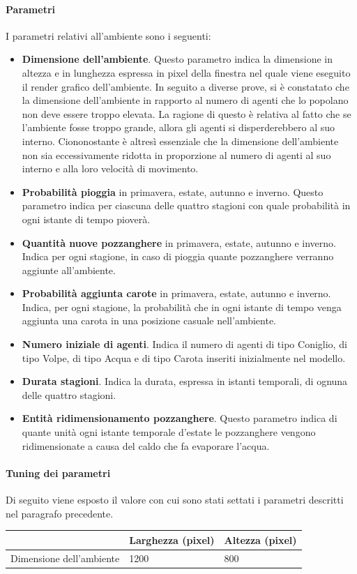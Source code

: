 \documentclass[11pt]{article}
\begin{document}
\paragraph{Parametri}
I parametri relativi all'ambiente sono i seguenti: 
\begin{itemize}
    \item \textbf{Dimensione dell'ambiente}. Questo parametro indica la dimensione in altezza e in lunghezza espressa in pixel della finestra nel quale viene eseguito il render grafico dell'ambiente. In seguito a diverse prove, si è constatato che la dimensione dell'ambiente in rapporto al numero di agenti che lo popolano non deve essere troppo elevata. La ragione di questo è relativa al fatto che se l'ambiente fosse troppo grande, allora gli agenti si disperderebbero al suo interno. Ciononostante è altresì essenziale che la dimensione dell'ambiente non sia eccessivamente ridotta in proporzione al numero di agenti al suo interno e alla loro velocità di movimento. 
    \item \textbf{Probabilità pioggia} in primavera, estate, autunno e inverno. Questo parametro indica per ciascuna delle quattro stagioni con quale probabilità in ogni istante di tempo pioverà.
    \item \textbf{Quantità nuove pozzanghere} in primavera, estate, autunno e inverno. Indica per ogni stagione, in caso di pioggia quante pozzanghere verranno aggiunte all'ambiente. 
    \item \textbf{Probabilità aggiunta carote} in primavera, estate, autunno e inverno. Indica, per ogni stagione, la probabilità che in ogni istante di tempo venga aggiunta una carota in una posizione casuale nell'ambiente. 
    \item \textbf{Numero iniziale di agenti}. Indica il numero di agenti di tipo Coniglio, di tipo Volpe, di tipo Acqua e di tipo Carota inseriti inizialmente nel modello. 
    \item \textbf{Durata stagioni}. Indica la durata, espressa in istanti temporali, di ognuna delle quattro stagioni. 
    \item \textbf{Entità ridimensionamento pozzanghere}. Questo parametro indica di quante unità ogni istante temporale d'estate le pozzanghere vengono ridimensionate a causa del caldo che fa evaporare l'acqua. 
\end{itemize}
\vspace{2pt}
\paragraph{Tuning dei parametri}
\label{sec:tuningAmbiente}
Di seguito viene esposto il valore con cui sono stati settati i parametri descritti nel paragrafo precedente.
\begin{table}[h!]
\centering
\begin{tabular}{@{}lll@{}}
\toprule
                         & Larghezza (pixel) & Altezza (pixel) \\ \midrule
Dimensione dell'ambiente & 1200      & 800      
\end{tabular}
\end{table}
\end{document}
